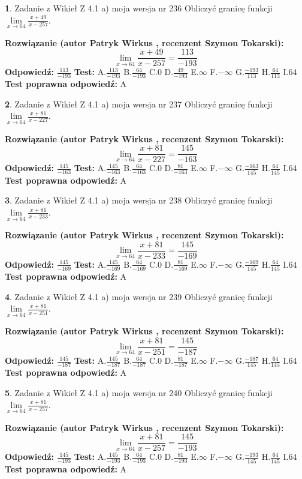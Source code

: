 \documentclass[12pt, a4paper]{article}
\theoremstyle{definition} %
\newtheorem{zad}{}
\newcommand{\zadStart}[1]{\begin{zad}#1\newline}
\newcommand{\zadStop}{\end{zad}}
\newcommand{\rozwStart}[2]{\noindent \textbf{Rozwiązanie (autor #1 , recenzent #2): }\newline}
\newcommand{\rozwStop}{\newline}
\newcommand{\odpStart}{\noindent \textbf{Odpowiedź:}\newline}
\newcommand{\odpStop}{\newline}
\newcommand{\testStart}{\noindent \textbf{Test:}\newline}
\newcommand{\testStop}{\newline}
\newcommand{\kluczStart}{\noindent \textbf{Test poprawna odpowiedź:}\newline}
\newcommand{\kluczStop}{\newline}
\begin{document}
\zadStart{Zadanie z Wikieł Z 4.1 a) moja wersja nr 236}
Obliczyć granicę funkcji $\lim\limits_{x\to64}\frac{x+49}{x-257}$.
\zadStop
\rozwStart{Patryk Wirkus}{Szymon Tokarski}
$$\lim\limits_{x\to64}\frac{x+49}{x-257} = \frac{113}{-193}$$
\rozwStop
\odpStart
$\frac{113}{-193}$
\odpStop
\testStart
A.$\frac{113}{-193}$
B.$\frac{64}{-193}$
C.$0$
D.$\frac{49}{-193}$
E.$\infty$
F.$-\infty$
G.$\frac{-193}{113}$
H.$\frac{64}{113}$
I.$64$
\testStop
\kluczStart
A
\kluczStop



\zadStart{Zadanie z Wikieł Z 4.1 a) moja wersja nr 237}
Obliczyć granicę funkcji $\lim\limits_{x\to64}\frac{x+81}{x-227}$.
\zadStop
\rozwStart{Patryk Wirkus}{Szymon Tokarski}
$$\lim\limits_{x\to64}\frac{x+81}{x-227} = \frac{145}{-163}$$
\rozwStop
\odpStart
$\frac{145}{-163}$
\odpStop
\testStart
A.$\frac{145}{-163}$
B.$\frac{64}{-163}$
C.$0$
D.$\frac{81}{-163}$
E.$\infty$
F.$-\infty$
G.$\frac{-163}{145}$
H.$\frac{64}{145}$
I.$64$
\testStop
\kluczStart
A
\kluczStop



\zadStart{Zadanie z Wikieł Z 4.1 a) moja wersja nr 238}
Obliczyć granicę funkcji $\lim\limits_{x\to64}\frac{x+81}{x-233}$.
\zadStop
\rozwStart{Patryk Wirkus}{Szymon Tokarski}
$$\lim\limits_{x\to64}\frac{x+81}{x-233} = \frac{145}{-169}$$
\rozwStop
\odpStart
$\frac{145}{-169}$
\odpStop
\testStart
A.$\frac{145}{-169}$
B.$\frac{64}{-169}$
C.$0$
D.$\frac{81}{-169}$
E.$\infty$
F.$-\infty$
G.$\frac{-169}{145}$
H.$\frac{64}{145}$
I.$64$
\testStop
\kluczStart
A
\kluczStop



\zadStart{Zadanie z Wikieł Z 4.1 a) moja wersja nr 239}
Obliczyć granicę funkcji $\lim\limits_{x\to64}\frac{x+81}{x-251}$.
\zadStop
\rozwStart{Patryk Wirkus}{Szymon Tokarski}
$$\lim\limits_{x\to64}\frac{x+81}{x-251} = \frac{145}{-187}$$
\rozwStop
\odpStart
$\frac{145}{-187}$
\odpStop
\testStart
A.$\frac{145}{-187}$
B.$\frac{64}{-187}$
C.$0$
D.$\frac{81}{-187}$
E.$\infty$
F.$-\infty$
G.$\frac{-187}{145}$
H.$\frac{64}{145}$
I.$64$
\testStop
\kluczStart
A
\kluczStop



\zadStart{Zadanie z Wikieł Z 4.1 a) moja wersja nr 240}
Obliczyć granicę funkcji $\lim\limits_{x\to64}\frac{x+81}{x-257}$.
\zadStop
\rozwStart{Patryk Wirkus}{Szymon Tokarski}
$$\lim\limits_{x\to64}\frac{x+81}{x-257} = \frac{145}{-193}$$
\rozwStop
\odpStart
$\frac{145}{-193}$
\odpStop
\testStart
A.$\frac{145}{-193}$
B.$\frac{64}{-193}$
C.$0$
D.$\frac{81}{-193}$
E.$\infty$
F.$-\infty$
G.$\frac{-193}{145}$
H.$\frac{64}{145}$
I.$64$
\testStop
\kluczStart
A
\kluczStop
\end{document}
